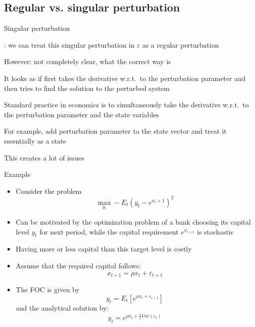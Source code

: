 \renewcommand{\Source}{}
\subsection{Regular vs. singular perturbation}
\begin{frame}{Singular perturbation}
  \begin{witemize}
    \item \textcite{Fleming1971}: we can treat this singular perturbation in $\varepsilon$ as a regular perturbation \parencite[according to][]{Judd1998}
    \item However: not completely clear, what the correct way is
    \item It looks as if \textcite{Fleming1971} first takes the derivative w.r.t.\ to the perturbation parameter and then tries to find the solution to the perturbed system
    \item Standard practice in economics is to simultaneously take the derivative w.r.t.\ to the perturbation parameter and the state variables
    \item For example, \textcite{FVetal2010b} add perturbation parameter to the state vector and treat it essentially as a state
    \item This creates a lot of issues
  \end{witemize}
\end{frame}

\begin{frame}{Example}
  \begin{itemize}
    \item Consider the problem
          \begin{equation}
            \mathop {\max }\limits_{{y_t}}  -{E_t}{\left( y_t - e^{x_t+1} \right)^2}
          \end{equation}
    \item Can be motivated by the optimization problem of a bank choosing its capital level $y_t$ for next period, while the capital requirement $e^{x_{t+1}}$ is stochastic
    \item Having more or less capital than this target level is costly
    \item Assume that the required capital follows:
          \begin{equation}
            x_{t+1}=\rho {x_t} + {\varepsilon _{t + 1}}
          \end{equation}
    \item The FOC is given by
          \begin{equation}
            y_t = {E_t}\left[ {{e^{\rho {x_t} + {\varepsilon _{t + 1}}}}} \right] \label{eq:aes_example_FOC}
          \end{equation}
          and the analytical solution by:
          \begin{equation}
            y_t = {e^{\rho {x_t} + \frac{1}{2}Var\left( {{\varepsilon _t}} \right)}} \label{eq:aes_example_true_solution}
          \end{equation}
  \end{itemize}
\end{frame}

